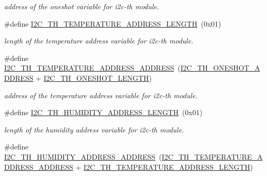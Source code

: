 \begin{DoxyCompactItemize}
\begin{DoxyCompactList}\small\item\em address of the oneshot variable for i2c-\/th module. \end{DoxyCompactList}\item 
\mbox{\label{registers-th_8h_a5279f5408464c6419cb81ff8ef8f4480}} 
\#define \hyperlink{registers-th_8h_a5279f5408464c6419cb81ff8ef8f4480}{I2\+C\+\_\+\+T\+H\+\_\+\+T\+E\+M\+P\+E\+R\+A\+T\+U\+R\+E\+\_\+\+A\+D\+D\+R\+E\+S\+S\+\_\+\+L\+E\+N\+G\+TH}~(0x01)
\begin{DoxyCompactList}\small\item\em length of the temperature address variable for i2c-\/th module. \end{DoxyCompactList}\item 
\mbox{\label{registers-th_8h_adcb39cb83eb5044753bb04c0d050ecba}} 
\#define \hyperlink{registers-th_8h_adcb39cb83eb5044753bb04c0d050ecba}{I2\+C\+\_\+\+T\+H\+\_\+\+T\+E\+M\+P\+E\+R\+A\+T\+U\+R\+E\+\_\+\+A\+D\+D\+R\+E\+S\+S\+\_\+\+A\+D\+D\+R\+E\+SS}~(\hyperlink{registers-th_8h_ad4150157cb88a802b002ec84ebcc1706}{I2\+C\+\_\+\+T\+H\+\_\+\+O\+N\+E\+S\+H\+O\+T\+\_\+\+A\+D\+D\+R\+E\+SS} + \hyperlink{registers-th_8h_a38df5cc5dfe2b225095688c18642605b}{I2\+C\+\_\+\+T\+H\+\_\+\+O\+N\+E\+S\+H\+O\+T\+\_\+\+L\+E\+N\+G\+TH})
\begin{DoxyCompactList}\small\item\em address of the temperature address variable for i2c-\/th module. \end{DoxyCompactList}\item 
\mbox{\label{registers-th_8h_abaf123f62e7e2d51c831c7379e55fba7}} 
\#define \hyperlink{registers-th_8h_abaf123f62e7e2d51c831c7379e55fba7}{I2\+C\+\_\+\+T\+H\+\_\+\+H\+U\+M\+I\+D\+I\+T\+Y\+\_\+\+A\+D\+D\+R\+E\+S\+S\+\_\+\+L\+E\+N\+G\+TH}~(0x01)
\begin{DoxyCompactList}\small\item\em length of the humidity address variable for i2c-\/th module. \end{DoxyCompactList}\item 
\mbox{\label{registers-th_8h_a2d41bc44e9839348561ba855d74451dd}} 
\#define \hyperlink{registers-th_8h_a2d41bc44e9839348561ba855d74451dd}{I2\+C\+\_\+\+T\+H\+\_\+\+H\+U\+M\+I\+D\+I\+T\+Y\+\_\+\+A\+D\+D\+R\+E\+S\+S\+\_\+\+A\+D\+D\+R\+E\+SS}~(\hyperlink{registers-th_8h_adcb39cb83eb5044753bb04c0d050ecba}{I2\+C\+\_\+\+T\+H\+\_\+\+T\+E\+M\+P\+E\+R\+A\+T\+U\+R\+E\+\_\+\+A\+D\+D\+R\+E\+S\+S\+\_\+\+A\+D\+D\+R\+E\+SS} + \hyperlink{registers-th_8h_a5279f5408464c6419cb81ff8ef8f4480}{I2\+C\+\_\+\+T\+H\+\_\+\+T\+E\+M\+P\+E\+R\+A\+T\+U\+R\+E\+\_\+\+A\+D\+D\+R\+E\+S\+S\+\_\+\+L\+E\+N\+G\+TH})

\end{DoxyCompactItemize}
